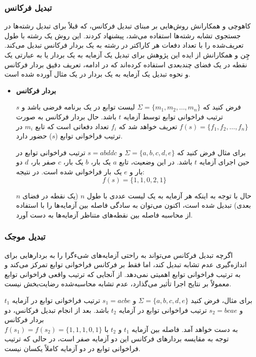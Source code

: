\subsubsection{تبدیل فرکانس }
کاهوچی و همکارانش \cite{kahveci2001efficient} روش‌هایی بر مبنای تبدیل فرکانس، که قبلاً برای تبدیل رشته‌ها در جستجوی تشابه رشته‌ها استفاده می‌شد، پیشنهاد کردند. این روش یک رشته با طول تعریف‌شده را با تعداد دفعات هر کاراکتر در رشته به یک بردار فرکانس تبدیل می‌کند. چِن و همکارانش از ایده این پژوهش برای تبدیل یک آزمایه به یک بردار یا به عبارتی یک نقطه در یک فضای چندبعدی استفاده کرده‌اند که در ادامه، تعریف دقیق بردار فرکانس و نحوه تبدیل یک آزمایه به یک بردار در یک مثال آورده شده است.

\begin{itemize}
	\item \textbf{بردار فرکانس}
	
	فرض کنید که \(\Sigma = \{m_1, m_2, \dots, m_n\}\) لیست توابع در یک برنامه فرضی باشد و \(s\) ترتیب فراخوانی توابع توسط آزمایه \(t\) باشد. حال بردار فرکانس به صورت 
	\(f(s) = \{f_1, f_2, \dots, f_n\}\)
	 تعریف خواهد شد که \(f_i\) تعداد دفعاتی است که تابع \(m_i\) در ترتیب فراخوانی توابع (\(s\)) حضور دارد.
	
	برای مثال فرض کنید که \(\Sigma = \{a, b, c, d, e\}\) و \(s = abddc\) ترتیب فراخوانی توابع در حین اجرای آزمایه \(t\) باشد. در این وضعیت، تابع \(a\) یک بار، \(b\) یک بار، \(c\) صفر بار، \(d\) دو بار و \(e\) یک بار فراخوانی شده است. در نتیجه:
	\[
	f(s) = \{1, 1, 0, 2, 1\}
	\]
	
	حال با توجه به اینکه هر آزمایه به یک لیست عددی با طول \(n\) (یک نقطه در فضای \(n\) بعدی) تبدیل شده است، اکنون می‌توان به سادگی فاصله بین آزمایه‌ها را با استفاده از محاسبه فاصله بین نقطه‌های متناظر آزمایه‌ها به دست آورد.
	
\end{itemize}

\subsubsection{تبدیل موجک}
اگرچه تبدیل فرکانس می‌تواند به راحتی آزمایه‌های شیء‌گرا را به بردارهایی برای اندازه‌گیری عدم تشابه تبدیل کند، اما فقط بر فرکانس فراخوانی توابع تمرکز می‌کند و به ترتیب فراخوانی توابع اهمیتی نمی‌دهد. از آنجایی که ترتیب واقعی فراخوانی توابع معمولاً بر نتایج اجرا تأثیر می‌گذارد، عدم تشابه محاسبه‌شده رضایت‌بخش نیست.

برای مثال، فرض کنید \(\Sigma = \{a, b, c, d, e\}\) و \(s_1 = acbe\) ترتیب فراخوانی توابع در آزمایه \(t_1\) و \(s_2 = bcae\) ترتیب فراخوانی توابع در آزمایه \(t_2\) باشد. بعد از انجام تبدیل فرکانس، دو بردار فرکانس\\ \(f(s_1) = f(s_2) = \{1, 1, 1, 0, 1\}\) به دست خواهد آمد. فاصله بین آزمایه \(t_1\) و \(t_2\) با توجه به مقایسه بردارهای فرکانس این دو آزمایه صفر است، در حالی که ترتیب فراخوانی توابع در دو آزمایه کاملاً یکسان نیست.


